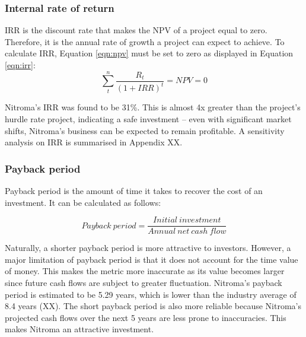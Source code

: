 \subsubsection{Internal rate of return}
IRR is the discount rate that makes the NPV of a project equal to zero. Therefore, it is the annual rate of growth a project can expect to achieve. To calculate IRR, Equation \ref{eqn:npv} must be set to zero as displayed in Equation \ref{eqn:irr}:
\begin{equation}
\label{eqn:irr}
    \sum_t^n\frac{R_{t}}{(1+IRR)^{t}}=NPV=0
\end{equation}

Nitroma’s IRR was found to be 31\%. This is almost 4x greater than the project’s hurdle rate project, indicating a safe investment – even with significant market shifts, Nitroma’s business can be expected to remain profitable. A sensitivity analysis on IRR is summarised in Appendix XX.

\subsubsection{Payback period}
\label{sec:pby}
Payback period is the amount of time it takes to recover the cost of an investment. It can be calculated as follows:

\begin{equation}
\label{eqn:payback}
    Payback\:period = \frac{Initial\:investment}{Annual\:net\:cash\:flow}
\end{equation}

Naturally, a shorter payback period is more attractive to investors. However, a major limitation of payback period is that it does not account for the time value of money. This makes the metric more inaccurate as its value becomes larger since future cash flows are subject to greater fluctuation. Nitroma’s payback period is estimated to be 5.29 years, which is lower than the industry average of 8.4 years (XX).  The short payback period is also more reliable because Nitroma’s projected cash flows over the next 5 years are less prone to inaccuracies. This makes Nitroma an attractive investment. 


